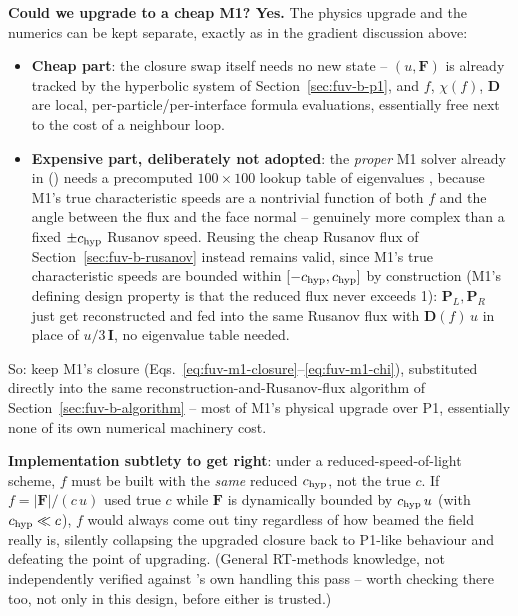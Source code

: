 \textbf{Could we upgrade to a cheap M1? Yes.} The physics upgrade and
the numerics can be kept separate, exactly as in the gradient
discussion above:
\begin{itemize}
  \item \textbf{Cheap part}: the closure swap itself needs no new
    state -- $(u,\mathbf F)$ is already tracked by the hyperbolic system
    of Section~\ref{sec:fuv-b-p1}, and $f$, $\chi(f)$, $\mathbf D$ are
    local, per-particle/per-interface formula evaluations, essentially
    free next to the cost of a neighbour loop.
  \item \textbf{Expensive part, deliberately not adopted}: the
    \emph{proper} M1 solver already in 
    () needs a precomputed
    $100\times100$ lookup table of eigenvalues
    \citep{Gonzalez2007}, because M1's true characteristic speeds are a
    nontrivial function of both $f$ and the angle between the flux and
    the face normal -- genuinely more complex than a fixed
    $\pm c_{\rm hyp}$ Rusanov speed. Reusing the cheap Rusanov flux of
    Section~\ref{sec:fuv-b-rusanov} instead remains valid, since M1's
    true characteristic speeds are bounded within $[-c_{\rm hyp},c_{\rm
    hyp}]$ by construction (M1's defining design property is that the
    reduced flux never exceeds 1): $\mathbf P_L,\mathbf P_R$ just get
    reconstructed and fed into the same Rusanov flux with $\mathbf
    D(f)\,u$ in place of $u/3\,\mathbf I$, no eigenvalue table needed.
\end{itemize}
So: keep M1's closure (Eqs.~\ref{eq:fuv-m1-closure}--\ref{eq:fuv-m1-chi}),
substituted directly into the same reconstruction-and-Rusanov-flux
algorithm of Section~\ref{sec:fuv-b-algorithm} -- most of M1's physical
upgrade over P1, essentially none of its own numerical machinery cost.

\textbf{Implementation subtlety to get right}: under a
reduced-speed-of-light scheme, $f$ must be built with the \emph{same}
reduced $c_{\rm hyp}$, not the true $c$. If $f=|\mathbf F|/(c\,u)$ used
true $c$ while $\mathbf F$ is dynamically bounded by $c_{\rm hyp}\,u$
(with $c_{\rm hyp}\ll c$), $f$ would always come out tiny regardless of
how beamed the field really is, silently collapsing the upgraded
closure back to P1-like behaviour and defeating the point of upgrading.
(General RT-methods knowledge, not independently verified against
's own  handling this
pass -- worth checking there too, not only in this design, before
either is trusted.)

